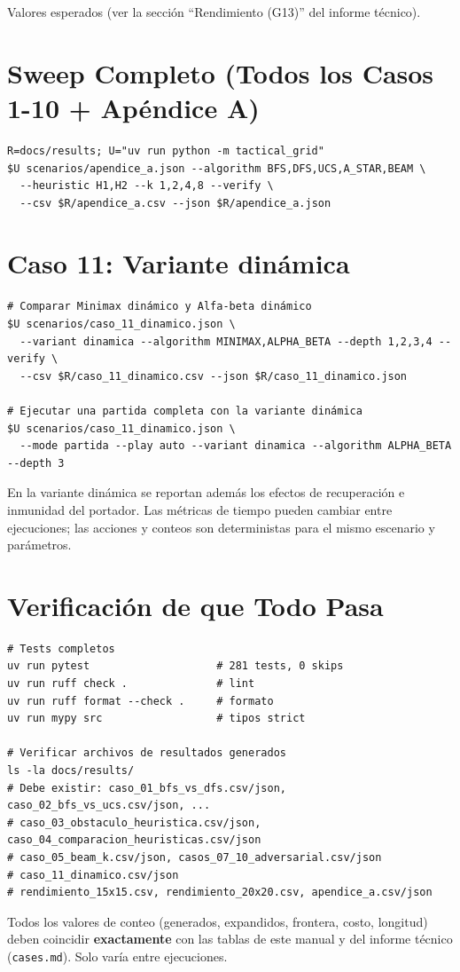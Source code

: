 Valores esperados (ver la sección ``Rendimiento (G13)'' del informe técnico).


\section{Sweep Completo (Todos los Casos 1-10 + Apéndice A)}
\label{sec:rep-sweep}

\begin{verbatim}
R=docs/results; U="uv run python -m tactical_grid"
$U scenarios/apendice_a.json --algorithm BFS,DFS,UCS,A_STAR,BEAM \
  --heuristic H1,H2 --k 1,2,4,8 --verify \
  --csv $R/apendice_a.csv --json $R/apendice_a.json
\end{verbatim}

\section{Caso 11: Variante dinámica}
\label{sec:rep-dinamica}

\begin{verbatim}
# Comparar Minimax dinámico y Alfa-beta dinámico
$U scenarios/caso_11_dinamico.json \
  --variant dinamica --algorithm MINIMAX,ALPHA_BETA --depth 1,2,3,4 --verify \
  --csv $R/caso_11_dinamico.csv --json $R/caso_11_dinamico.json

# Ejecutar una partida completa con la variante dinámica
$U scenarios/caso_11_dinamico.json \
  --mode partida --play auto --variant dinamica --algorithm ALPHA_BETA --depth 3
\end{verbatim}

En la variante dinámica se reportan además los efectos de recuperación e inmunidad del
portador. Las métricas de tiempo pueden cambiar entre ejecuciones; las acciones y conteos
son deterministas para el mismo escenario y parámetros.

\section{Verificación de que Todo Pasa}
\label{sec:verificar-todo}

\begin{verbatim}
# Tests completos
uv run pytest                    # 281 tests, 0 skips
uv run ruff check .              # lint
uv run ruff format --check .     # formato
uv run mypy src                  # tipos strict

# Verificar archivos de resultados generados
ls -la docs/results/
# Debe existir: caso_01_bfs_vs_dfs.csv/json, caso_02_bfs_vs_ucs.csv/json, ...
# caso_03_obstaculo_heuristica.csv/json, caso_04_comparacion_heuristicas.csv/json
# caso_05_beam_k.csv/json, casos_07_10_adversarial.csv/json
# caso_11_dinamico.csv/json
# rendimiento_15x15.csv, rendimiento_20x20.csv, apendice_a.csv/json
\end{verbatim}

Todos los valores de conteo (generados, expandidos, frontera, costo, longitud) deben
coincidir \textbf{exactamente} con las tablas de este manual y del informe técnico
(\texttt{cases.md}). Solo \code{tiempo\_segundos} varía entre ejecuciones.